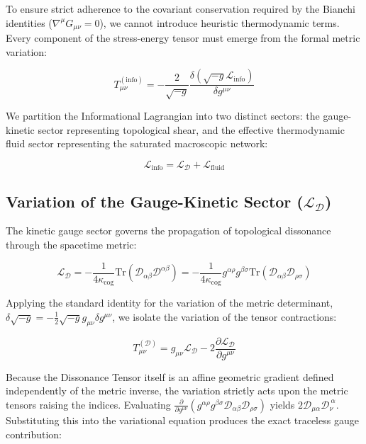\documentclass[12pt,openany]{book}
\theoremstyle{plain}
\theoremstyle{definition}
\theoremstyle{remark}
\begin{document}
To ensure strict adherence to the covariant conservation required by the Bianchi identities ($\nabla^\mu G_{\mu\nu} = 0$), we cannot introduce heuristic thermodynamic terms. Every component of the stress-energy tensor must emerge from the formal metric variation:

\begin{equation}
T_{\mu\nu}^{(\text{info})} = -\frac{2}{\sqrt{-g}} \frac{\delta(\sqrt{-g}\mathcal{L}_{\text{info}})}{\delta g^{\mu\nu}}
\end{equation}

We partition the Informational Lagrangian into two distinct sectors: the gauge-kinetic sector representing topological shear, and the effective thermodynamic fluid sector representing the saturated macroscopic network:

\begin{equation}
\mathcal{L}_{\text{info}} = \mathcal{L}_{\mathcal{D}} + \mathcal{L}_{\text{fluid}}
\end{equation}

\subsection{Variation of the Gauge-Kinetic Sector ($\mathcal{L}_{\mathcal{D}}$)}

The kinetic gauge sector governs the propagation of topological dissonance through the spacetime metric:

\begin{equation}
\mathcal{L}_{\mathcal{D}} = -\frac{1}{4\kappa_{\text{cog}}} \text{Tr}(\mathcal{D}_{\alpha\beta} \mathcal{D}^{\alpha\beta}) = -\frac{1}{4\kappa_{\text{cog}}} g^{\alpha\rho} g^{\beta\sigma} \text{Tr}(\mathcal{D}_{\alpha\beta} \mathcal{D}_{\rho\sigma})
\end{equation}

Applying the standard identity for the variation of the metric determinant, $\delta\sqrt{-g} = -\frac{1}{2}\sqrt{-g} g_{\mu\nu} \delta g^{\mu\nu}$, we isolate the variation of the tensor contractions:

\begin{equation}
T_{\mu\nu}^{(\mathcal{D})} = g_{\mu\nu} \mathcal{L}_{\mathcal{D}} - 2 \frac{\partial \mathcal{L}_{\mathcal{D}}}{\partial g^{\mu\nu}}
\end{equation}

Because the Dissonance Tensor itself is an affine geometric gradient defined independently of the metric inverse, the variation strictly acts upon the metric tensors raising the indices. Evaluating $\frac{\partial}{\partial g^{\mu\nu}} \left( g^{\alpha\rho} g^{\beta\sigma} \mathcal{D}_{\alpha\beta} \mathcal{D}_{\rho\sigma} \right)$ yields $2 \mathcal{D}_{\mu\alpha} \mathcal{D}_{\nu}^{\ \alpha}$. Substituting this into the variational equation produces the exact traceless gauge contribution:
\end{document}
